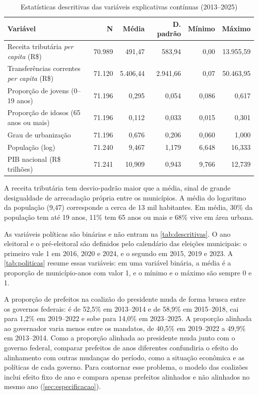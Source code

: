 \begin{table}[htbp]
\caption{Estatísticas descritivas das variáveis explicativas contínuas (2013--2025)}\label{tab:descritivas}
\footnotesize
\setlength{\tabcolsep}{4pt}
\begin{tabular}{lrrrrr}
\hline
\textbf{Variável} & \textbf{N} & \textbf{Média} & \textbf{D. padrão} & \textbf{Mínimo} & \textbf{Máximo} \\ \hline
Receita tributária \textit{per capita} (R\$) & 70.989 & 491,47 & 583,94 & 0,00 & 13.955,59 \\
Transferências correntes \textit{per capita} (R\$) & 71.120 & 5.406,44 & 2.941,66 & 0,07 & 50.463,95 \\
Proporção de jovens (0--19 anos) & 71.196 & 0,295 & 0,054 & 0,086 & 0,617 \\
Proporção de idosos (65 anos ou mais) & 71.196 & 0,112 & 0,033 & 0,015 & 0,301 \\
Grau de urbanização & 71.196 & 0,676 & 0,206 & 0,060 & 1,000 \\
População (log) & 71.240 & 9,467 & 1,179 & 6,648 & 16,333 \\
PIB nacional (R\$ trilhões) & 71.241 & 10,909 & 0,943 & 9,766 & 12,739 \\ \hline
\end{tabular}
\end{table}

A receita tributária tem desvio-padrão maior que a média, sinal de grande desigualdade de arrecadação própria entre os municípios. A média do logaritmo da população (9,47) corresponde a cerca de 13 mil habitantes. Em média, 30\% da população tem até 19 anos, 11\% tem 65 anos ou mais e 68\% vive em área urbana.

As variáveis políticas são binárias e não entram na \autoref{tab:descritivas}. O ano eleitoral e o pré-eleitoral são definidos pelo calendário das eleições municipais: o primeiro vale 1 em 2016, 2020 e 2024, e o segundo em 2015, 2019 e 2023. A \autoref{tab:politicas} resume essas variáveis: em uma variável binária, a média é a proporção de município-anos com valor 1, e o mínimo e o máximo são sempre 0 e 1.



A proporção de prefeitos na coalizão do presidente muda de forma brusca entre os governos federais: é de 52,5\% em 2013--2014 e de 58,9\% em 2015--2018, cai para 1,2\% em 2019--2022 e sobe para 14,0\% em 2023--2025. A proporção alinhada ao governador varia menos entre os mandatos, de 40,5\% em 2019--2022 a 49,9\% em 2013--2014. Como a proporção alinhada ao presidente muda junto com o governo federal, comparar prefeitos de anos diferentes confundiria o efeito do alinhamento com outras mudanças do período, como a situação econômica e as políticas de cada governo. Para contornar esse problema, o modelo das coalizões inclui efeito fixo de ano e compara apenas prefeitos alinhados e não alinhados no mesmo ano (\autoref{sec:especificacao}).

